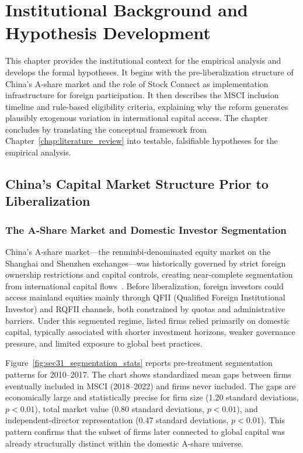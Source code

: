 \chapter{Institutional Background and Hypothesis Development}
\label{chap:institutional_background}

This chapter provides the institutional context for the empirical analysis and develops the formal hypotheses. It begins with the pre-liberalization structure of China's A-share market and the role of Stock Connect as implementation infrastructure for foreign participation. It then describes the MSCI inclusion timeline and rule-based eligibility criteria, explaining why the reform generates plausibly exogenous variation in international capital access. The chapter concludes by translating the conceptual framework from Chapter~\ref{chap:literature_review} into testable, falsifiable hypotheses for the empirical analysis.

\section{China's Capital Market Structure Prior to Liberalization}

\subsection{The A-Share Market and Domestic Investor Segmentation}

China's A-share market---the renminbi-denominated equity market on the Shanghai and Shenzhen exchanges---was historically governed by strict foreign ownership restrictions and capital controls, creating near-complete segmentation from international capital flows~\cite{Cheng2024}. Before liberalization, foreign investors could access mainland equities mainly through QFII (Qualified Foreign Institutional Investor) and RQFII channels, both constrained by quotas and administrative barriers. Under this segmented regime, listed firms relied primarily on domestic capital, typically associated with shorter investment horizons, weaker governance pressure, and limited exposure to global best practices.

Figure~\ref{fig:sec31_segmentation_stats} reports pre-treatment segmentation patterns for 2010--2017. The chart shows standardized mean gaps between firms eventually included in MSCI (2018--2022) and firms never included. The gaps are economically large and statistically precise for firm size (1.20 standard deviations, $p<0.01$), total market value (0.80 standard deviations, $p<0.01$), and independent-director representation (0.47 standard deviations, $p<0.01$). This pattern confirms that the subset of firms later connected to global capital was already structurally distinct within the domestic A-share universe.

